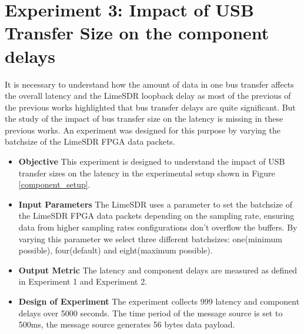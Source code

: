 \section{Experiment 3: Impact of USB Transfer Size on the component delays} \label{exp3}

It is necessary to understand how the amount of data in one bus transfer affects the overall latency and the LimeSDR loopback delay as most of the previous of the previous works highlighted that bus transfer delays are quite significant.
But the study of the impact of bus transfer size on the latency is missing in these previous works.
An experiment was designed for this purpose by varying the batchsize of the LimeSDR FPGA data packets.

\begin{itemize}
    \item \textbf{Objective} This experiment is designed to understand the impact of USB transfer sizes on the latency in the experimental setup shown in Figure \ref{component_setup}.
    \item \textbf{Input Parameters} The LimeSDR uses a parameter to set the batchsize of the LimeSDR FPGA data packets depending on the sampling rate, ensuring data from higher sampling rates configurations don't overflow the buffers.
    By varying this parameter we select three different batchsizes:
    one(minimum possible), four(default) and eight(maximum possible).
    \item \textbf{Output Metric} The latency and component delays are measured as defined in Experiment 1 and Experiment 2.
    \item \textbf{Design of Experiment} The experiment collects 999 latency and component delays over 5000 seconds. The time period of the message source is set to 500ms, the message source generates 56 bytes data payload.
\end{itemize}






